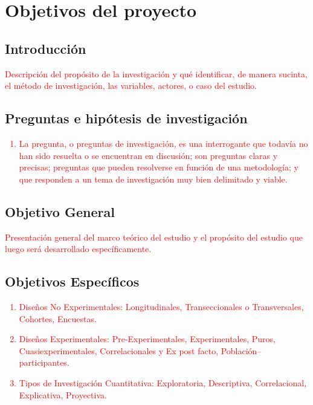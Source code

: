 \chapter{Objetivos del proyecto}\label{Cap:03}
\thispagestyle{empty}

\section{Introducción}

\textcolor{red}{Descripción del propósito de la investigación y qué identificar, de manera sucinta, el método de 
investigación, las variables, actores, o caso del estudio.}

\section{Preguntas e hipótesis de investigación}

\textcolor{red}{\begin{enumerate}
	\item La pregunta, o preguntas de investigación, es una interrogante que todavía no han sido resuelta o se 
encuentran en discusión; son preguntas claras y precisas; preguntas que pueden resolverse en función de una metodología; 
y que responden a un tema de investigación muy bien delimitado y viable.
\end{enumerate}}

\section{Objetivo General}

\textcolor{red}{Presentación general del marco teórico del estudio y el propósito del estudio que luego
será desarrollado específicamente.}

\section{Objetivos Específicos}

\textcolor{red}{\begin{enumerate}
	\item Diseños No Experimentales: Longitudinales, Transeccionales o Transversales, Cohortes, Encuestas.
	\item Diseños Experimentales: Pre-Experimentales, Experimentales, Puros, Cuasiexperimentales, Correlacionales y Ex post facto, Población--participantes.
	\item Tipos de Investigación Cuantitativa: Exploratoria, Descriptiva, Correlacional, Explicativa, Proyectiva.
\end{enumerate}} 

